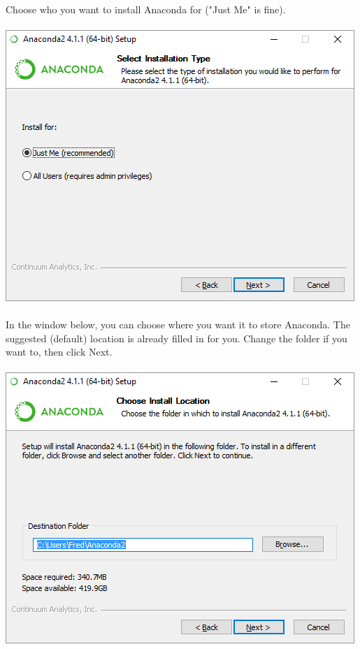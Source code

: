 \documentclass[]{article}
\begin{document}
\paragraph{}
Choose who you want to install Anaconda for ("Just Me" is fine).
\paragraph{}
\begin{centering}
    \centerline{\includegraphics[scale=0.7]{Screenshot_7.png}}
\end{centering}

\paragraph{}
In the window below, you can choose where you want it to store Anaconda. The suggested (default) location is already filled in for you. Change the folder if you want to, then click Next.
\paragraph{}
\begin{centering}
    \centerline{\includegraphics[scale=0.7]{Screenshot_8.png}}
\end{centering}
\end{document}

